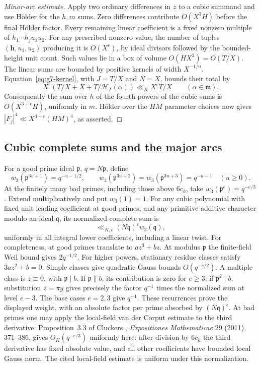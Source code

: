 \documentclass[11pt]{amsart}
\theoremstyle{definition}
\numberwithin{equation}{section}
\begin{document}
\begin{proof}[Minor-arc estimate]
Apply two ordinary differences in $z$ to a cubic summand and use H\"older
for the $h,m$ sums.  Zero differences contribute $O(X^3H)$ before the final
H\"older factor.  Every remaining linear coefficient is a fixed nonzero
multiple of $h_1\cdots h_j u_1u_2$.  For any prescribed nonzero value,
the number of tuples $(\mathbf h,u_1,u_2)$ producing it is $O(X^\epsilon)$,
by ideal divisors followed by the bounded-height unit count.  Such values
lie in a box of volume $O(HX^2)=O(T/X)$.
The linear sums are bounded by positive kernels of width $X^{-1/n}$.
Equation~\eqref{eq:g7-kernel}, with $J=T/X$ and $N=X$, bounds their total by
\[
 X^\epsilon\left(T/X+X+T/\mathcal H_T(\alpha)\right)
       \ll_K X^\epsilon T/X
 \qquad(\alpha\in\mathfrak m).
\]
Consequently the sum over $h$ of the fourth powers of the cubic sums is
$O(X^{3+\epsilon}H)$, uniformly in $m$.  H\"older over the $HM$ parameter
choices now gives $|F_j|^4\ll X^{3+\epsilon}(HM)^4$, as asserted.
\end{proof}

\subsection{Cubic complete sums and the major arcs}

For a good prime ideal $\mathfrak p$, $q=N\mathfrak p$, define
\[
 w_3(\mathfrak p^{3u+1})=q^{-u-1/2},\qquad
 w_3(\mathfrak p^{3u+2})=w_3(\mathfrak p^{3u+3})=q^{-u-1}
 \quad(u\ge0).
\]
At the finitely many bad primes, including those above $6c_k$, take
$w_3(\mathfrak p^e)=q^{-e/3}$.  Extend multiplicatively and put $w_3(1)=1$.
For any cubic polynomial with fixed unit leading coefficient at good primes,
and any primitive additive character modulo an ideal $\mathfrak q$,
its normalized complete sum is
\begin{equation}\label{eq:g7-complete}
 \ll_{K,\epsilon}(N\mathfrak q)^\epsilon w_3(\mathfrak q),
\end{equation}
uniformly in all integral lower coefficients, including a linear twist.
For completeness, at good primes translate to $az^3+bz$.
At modulus $\mathfrak p$ the finite-field Weil bound gives $2q^{-1/2}$.
For higher powers, stationary residue classes satisfy $3az^2+b=0$.
Simple classes give quadratic Gauss bounds $O(q^{-e/2})$.
A multiple class is $z\equiv0$, with $\mathfrak p\mid b$.
If $\mathfrak p\parallel b$, its contribution is zero for $e\ge3$;
if $\mathfrak p^2\mid b$, substitution $z=\pi y$ gives precisely the
factor $q^{-1}$ times the normalized sum at level $e-3$.
The base cases $e=2,3$ give $q^{-1}$.  These recurrences prove the displayed
weight, with an absolute factor per prime absorbed by $(N\mathfrak q)^\epsilon$.
At bad primes one may apply the local-field van der Corput estimate to the
third derivative.  Proposition~3.3 of Cluckers \cite{Cluckers2011}, \emph{Expositiones Mathematicae}
29 (2011), 371--386, gives $O_K(q^{-e/3})$ uniformly here: after division by
$6c_k$ the third derivative has fixed absolute value, and all other coefficients
have bounded local Gauss norm.  The cited local-field estimate is uniform under this normalization.
\end{document}
